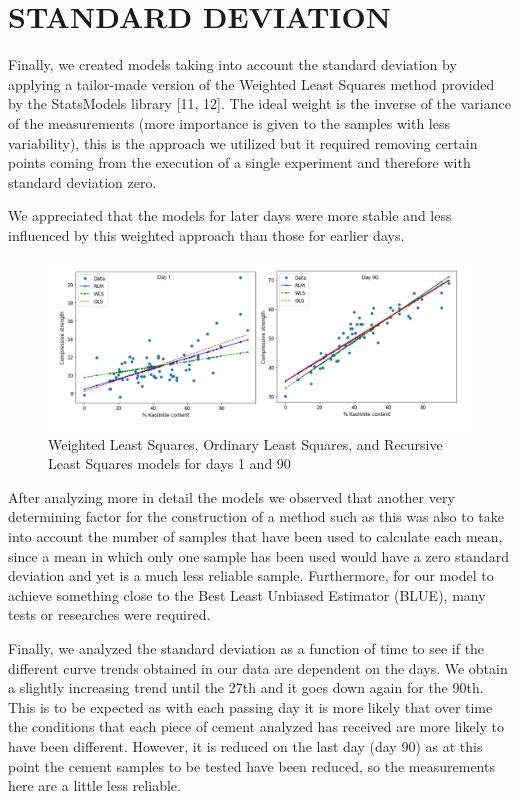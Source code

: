 \documentclass[10pt,conference,compsocconf]{IEEEtran}
\begin{document}
\section{STANDARD DEVIATION}

Finally, we created models taking into account the standard deviation by applying a tailor-made version of the Weighted Least Squares method provided by the StatsModels library [11, 12]. The ideal weight is the inverse of the variance of the measurements (more importance is given to the samples with less variability), this is the approach we utilized but it required removing certain points coming from the execution of a single experiment and therefore with standard deviation zero. 

We appreciated that the models for later days were more stable and less influenced by this weighted approach than those for earlier days.

\begin{figure}[htbp]
  \centering
  \includegraphics[width=\columnwidth]{figures/lr-ols-wls-rls-d1-d90.png}
  \vspace{-3mm}
  \caption{Weighted Least Squares, Ordinary Least Squares, and Recursive Least Squares models for days 1 and 90}
  \label{fig:wls-comp}
\end{figure}

After analyzing more in detail the models we observed that another very determining factor for the construction of a method such as this was also to take into account the number of samples that have been used to calculate each mean, since a mean in which only one sample has been used would have a zero standard deviation and yet is a much less reliable sample. Furthermore, for our model to achieve something close to the Best Least Unbiased Estimator (BLUE), many tests or researches were required.

Finally, we analyzed the standard deviation as a function of time to see if the different curve trends obtained in our data are dependent on the days. We obtain a slightly increasing trend until the 27th and it goes down again for the 90th. This is to be expected as with each passing day it is more likely that over time the conditions that each piece of cement analyzed has received are more likely to have been different. However, it is reduced on the last day (day 90) as at this point the cement samples to be tested have been reduced, so the measurements here are a little less reliable.
\end{document}
